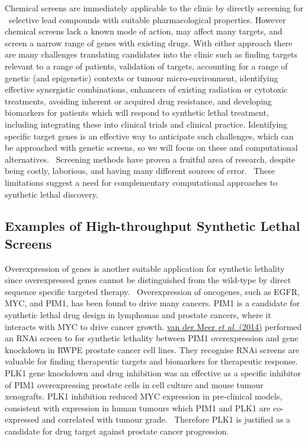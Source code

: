 Chemical screens are immediately applicable to the clinic by directly
screening for \ selective lead compounds with suitable pharmacological
properties. However chemical screens lack a known mode of action, may
affect many targets, and screen a narrow range of genes with existing
drugs. With either approach there are many challenges translating
candidates into the clinic such as finding targets relevant to a range
of patients, validation of targets, accounting for a range of genetic
(and epigenetic) contexts or tumour micro-environment, identifying
effective synergistic combinations, enhancers of existing radiation or
cytotoxic treatments, avoiding inherent or acquired drug resistance,
and developing biomarkers for patients which will respond to synthetic
lethal treatment, including integrating these into clinical trials and
clinical practice. Identifying specific target genes is an effective
way to anticipate such challenges, which can be approached with genetic
screens, so we will focus on these and computational alternatives.
\ Screening methods have proven a fruitful area of research, despite
being costly, laborious, and having many different sources of error.
\ These limitations suggest a need for complementary computational
approaches to synthetic lethal discovery. 


\subsection[Examples of High{}-throughput Synthetic Lethal
Screens]{Examples of High-throughput Synthetic Lethal Screens}

Overexpression of genes is another suitable application for synthetic
lethality since overexpressed genes cannot be distinguished from the
wild-type by direct sequence specific targeted therapy.
\ Overexpression of oncogenes, such as EGFR, MYC, and PIM1, has been
found to drive many cancers. PIM1 is a candidate for synthetic lethal
drug design in lymphomas and prostate cancers, where it interacts with
MYC to drive cancer growth. \hyperlink{ENREF103}{van der
Meer}\hyperlink{ENREF103}{\textit{ et al.}}\hyperlink{ENREF103}{
(2014)} performed an RNAi screen to for synthetic lethality between
PIM1 overexpression and gene knockdown in RWPE prostate cancer cell
lines. They recognise RNAi screens are valuable for finding
therapeutic targets and biomarkers for therapeutic response. PLK1
gene knockdown and drug inhibition was an effective as a specific
inhibitor of PIM1 overexpressing prostate cells in cell culture and
mouse tumour xenografts. PLK1 inhibition reduced MYC expression in
pre-clinical models, consistent with expression in human tumours which
PIM1 and PLK1 are co-expressed and correlated with tumour grade.
\ Therefore PLK1 is justified as a candidate for drug target against
prostate cancer progression. 


